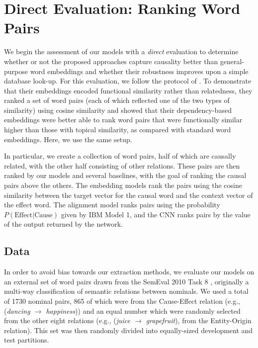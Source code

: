 
\section{Direct Evaluation: Ranking Word Pairs}
\label{sec-emnlp2016:directeval}


We begin the assessment of our models with a {\em direct} evaluation to determine whether or not the proposed approaches capture causality better than general-purpose word embeddings and whether their robustness improves upon a simple database look-up.
For this evaluation, we follow the protocol of \citet{levy2014dependency}.  
To demonstrate that their embeddings encoded functional similarity rather than relatedness, they ranked a set of word pairs (each of which reflected one of the two types of similarity) using cosine similarity and showed that their dependency-based embeddings were better able to rank word pairs that were functionally similar higher than those with topical similarity, as compared with standard word embeddings.  Here, we use the same setup. 
 
In particular, we create a collection of word pairs, half of which are causally related, with the other half consisting of other relations. 
These pairs are then ranked by our models and several baselines, with the goal of ranking the causal pairs above the others. 
The embedding models rank the pairs using the cosine similarity between the target vector for the causal word and the context vector of the effect word.  The alignment model ranks pairs using the probability $P(\text{Effect}|\text{Cause})$ given by IBM Model 1, and the CNN ranks pairs by the value of the output returned by the network.

\subsection{Data}
In order to avoid bias towards our extraction methods, we evaluate our models on an external set of word pairs drawn from the SemEval 2010 Task 8 \citep{hendrickx2009semeval}, originally a multi-way classification of semantic relations between nominals.  We used a total of 1730 nominal pairs, 865 of which were from the Cause-Effect relation (e.g., (\emph{dancing $\rightarrow$ happiness})) and an equal number which were randomly selected from the other eight relations (e.g., (\emph{juice $\rightarrow$ grapefruit}), from the Entity-Origin relation).  This set was then randomly divided into equally-sized development and test partitions.


